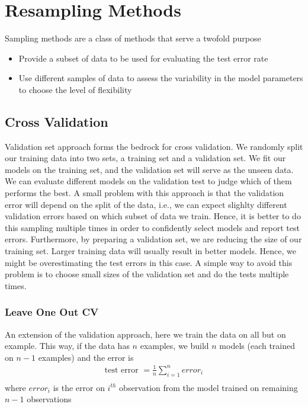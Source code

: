 \documentclass[11pt, a4paper]{article}
\begin{document}
    \section{Resampling Methods}
    Sampling methods are a class of methods that serve a twofold purpose
    \begin{itemize}
        \item Provide a subset of data to be used for evaluating the test error rate
        \item Use different samples of data to assess the variability in the model parameters to choose the level of flexibility
    \end{itemize}


    \subsection{Cross Validation}
    Validation set approach forms the bedrock for cross validation. We randomly split our training data into two sets, a training set and a validation set. We fit our models on the training set, and the validation set will serve as the unseen data. We can evaluate different models on the validation test to judge which of them performs the best.\newline
    A small problem with this approach is that the validation error will depend on the split of the data, i.e., we can expect slighlty different validation errors based on which subset of data we train. Hence, it is better to do this sampling multiple times in order to confidently select models and report test errors. \newline
    Furthermore, by preparing a validation set, we are reducing the size of our training set. Larger training data will usually result in better models. Hence, we might be overestimating the test errors in this case. A simple way to avoid this problem is to choose small sizes of the validation set and do the tests multiple times.

    \subsubsection{Leave One Out CV}
    An extension of the validation approach, here we train the data on all but on example. This way, if the data has $n$ examples, we build $n$ models (each trained on $n-1$ examples) and the error is
    \begin{align*}
        \text{test error } = \frac{1}{n}\sum_{i=1}^{n} error_{i}\\
    \end{align*}
    where $error_{i}$ is the error on $i^{th}$ observation from the model trained on remaining $n-1$ observations\newline
\end{document}

